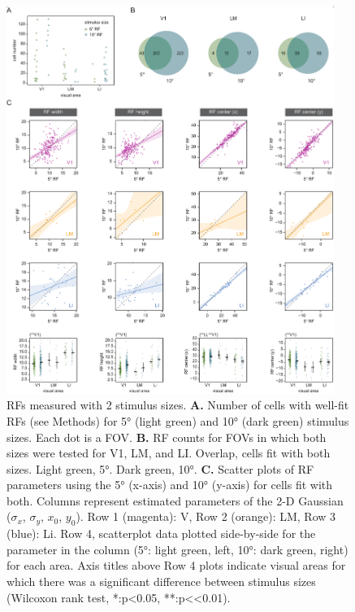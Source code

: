 \begin{figure}[tp!]
\includegraphics[width=0.95\textwidth]{figures/supplemental/fig_s6_rf5_v_rf10/fig_s6_rf5_rf10.pdf}
    \centering
    \caption[RF mapping stimuli]{RFs measured with 2 stimulus sizes.
    \textbf{A.} Number of cells with well-fit RFs (see Methods) for \ang{5} (light green) and \ang{10} (dark green) stimulus sizes. Each dot is a FOV.
    \textbf{B.} RF counts for FOVs in which both sizes were tested for V1, LM, and LI. Overlap, cells fit with both sizes. Light green, \ang{5}. Dark green, \ang{10}.
    \textbf{C.} Scatter plots of RF parameters using the \ang{5} (x-axis) and \ang{10} (y-axis) for cells fit with both. Columns represent estimated parameters of the 2-D Gaussian ($\sigma_x$, $\sigma_y$, $x_0$, $y_0$). Row 1 (magenta): V, Row 2 (orange): LM, Row 3 (blue): Li. Row 4, scatterplot data plotted side-by-side for the parameter in the column (\ang{5}: light green, left, \ang{10}: dark green, right) for each area. Axis titles above Row 4 plots indicate visual areas for which there was a significant difference between stimulus sizes (Wilcoxon rank test, *:p<0.05, **:p<<0.01).
    \label{supfig:rf5_rf10}}
\end{figure}

